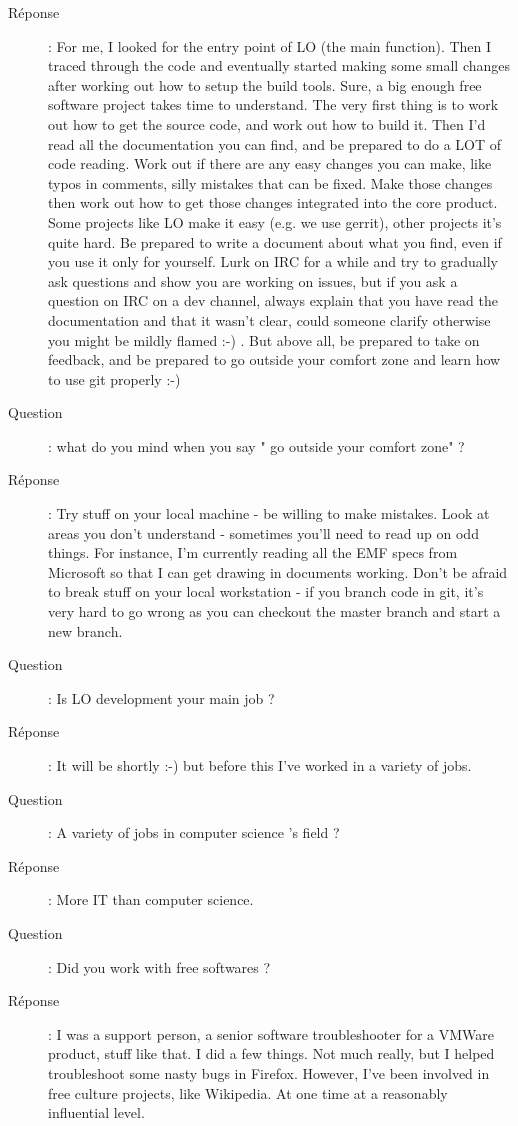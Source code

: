 \documentclass[a4paper,12pt, draft]{report}
\begin{document}
\begin{description}
\item [Réponse]:  For me, I looked for the entry point of LO (the main function). Then I traced through the code and eventually started making some small changes after working out how to setup the build tools. Sure, a big enough free software project takes time to understand. The very first thing is to work out how to get the source code, and work out how to build it. Then I'd read all the documentation you can find, and be prepared to do a LOT of code reading. Work out if there are any easy changes you can make, like typos in comments, silly mistakes that can be fixed. Make those changes then work out how to get those changes integrated into the core product. Some projects like LO make it easy (e.g. we use gerrit), other projects it's quite hard. Be prepared to write a document about what you find, even if you use it only for yourself. Lurk on IRC for a while and try to gradually ask questions and show you are working on issues, but if you ask a question on IRC on a dev channel, always explain that you have read the documentation and that it wasn't clear, could someone clarify otherwise you might be mildly flamed :-) . But above all, be prepared to take on feedback, and be prepared to go outside your comfort zone and learn how to use git properly :-)
\item [Question]:  what do you mind when you say " go outside your comfort zone" ?
\item [Réponse]:  Try stuff on your local machine - be willing to make mistakes. Look at areas you don't understand - sometimes you'll need to read up on odd things. For instance, I'm currently reading all the EMF specs from Microsoft so that I can get drawing in documents working. Don't be afraid to break stuff on your local workstation - if you branch code in git, it's very hard to go wrong as you can checkout the master branch and start a new branch.
\item [Question]:  Is LO development your main job ?
\item [Réponse]:  It will be shortly :-) but before this I've worked in a variety of jobs.
\item [Question]:  A variety of jobs in computer science 's field ?
\item [Réponse]:  More IT than computer science.
\item [Question]:  Did you work with free softwares ?
\item [Réponse]:  I was a support person, a senior software troubleshooter for a VMWare product, stuff like that. I did a few things. Not much really, but I helped troubleshoot some nasty bugs in Firefox. However, I've been involved in free culture projects, like Wikipedia. At one time at a reasonably influential level.

\end{description}
\end{document}
